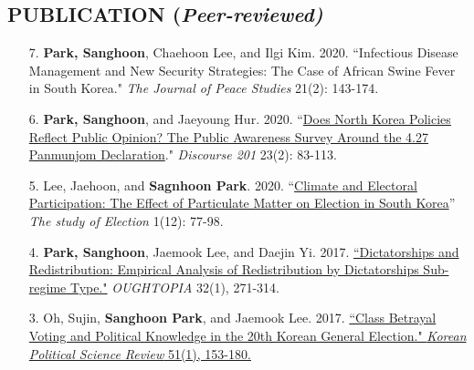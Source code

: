 \documentclass[11pt]{res} %
\begin{document}
\begin{resume}
\section{PUBLICATION (\it{Peer-reviewed})} 
\begin{enumerate}[leftmargin=*]
	\item[7.] \textbf{Park, Sanghoon}, Chaehoon Lee, and Ilgi Kim. 2020. ``Infectious Disease Management and New Security Strategies: The Case of African Swine Fever in South Korea." \textit{The Journal of Peace Studies} 21(2): 143-174.
	\item[6.] \textbf{Park, Sanghoon}, and Jaeyoung Hur. 2020. ``\href{journal.kstudy.com/ISS_DownLoad.asp?a_code=0g000726.pdf&inst=3345&isDownLoad=1&code=YqldZWtoSqVtJTNEMnMoNSUmN/B Z xLJTNEVHJpZQ==}{Does North Korea Policies Reflect Public Opinion? The Public Awareness Survey Around the 4.27 Panmunjom Declaration}." \textit{Discourse 201} 23(2): 83-113.
	\item[5.] Lee, Jaehoon, and \textbf{Sagnhoon Park}. 2020. ``\href{https://m.nec.go.kr/portal/cmm/fms/FileDown.do?atchFileId=5d0ffae936edc42f3b4e864801f86a0f4096c44da03fede418b94067e8f9d0ea&fileSn=1&bbsId=&searchYear=}{Climate and Electoral Participation: The Effect of Particulate Matter on Election in South Korea}'' \textit{The study of Election} 1(12): 77-98.  
	\item[4.] \textbf{Park, Sanghoon}, Jaemook Lee, and Daejin Yi. 2017. \href{http://www.dbpia.co.kr/Journal/ArticleDetail/NODE07183479?TotalCount=1&Seq=1&q=%5B%EB%8F%85%EC%9E%AC%EA%B5%AD%EA%B0%80%EC%99%80%20%EC%9E%AC%EB%B6%84%EB%B0%B0%C2%A7coldb%C2%A72%C2%A751%C2%A73%5D&searchWord=%EC%A0%84%EC%B2%B4%3D%5E%24%EB%8F%85%EC%9E%AC%EA%B5%AD%EA%B0%80%EC%99%80%20%EC%9E%AC%EB%B6%84%EB%B0%B0%5E*&Multimedia=0&isIdentifyAuthor=0&Collection=0&SearchAll=%EB%8F%85%EC%9E%AC%EA%B5%AD%EA%B0%80%EC%99%80%20%EC%9E%AC%EB%B6%84%EB%B0%B0&isFullText=0&specificParam=0&SearchMethod=0&Sort=1&SortType=desc&Page=1&PageSize=20#}{``Dictatorships and Redistribution: Empirical Analysis of Redistribution by Dictatorships Sub-regime Type."} \textit{OUGHTOPIA} 32(1), 271-314.
	\item[3.] Oh, Sujin, \textbf{Sanghoon Park}, and Jaemook Lee. 2017. \href{http://www.dbpia.co.kr/Journal/ArticleDetail/NODE07131578?TotalCount=1&Seq=1&q=%5B%EC%9D%B4%EC%9E%AC%EB%AC%B5%20%EC%98%A4%EC%88%98%EC%A7%84%20%EB%B0%95%EC%83%81%ED%9B%88%20%EA%B3%84%EA%B8%89%ED%88%AC%ED%91%9C%C2%A7coldb%C2%A72%C2%A751%C2%A73%5D&searchWord=%EC%A0%84%EC%B2%B4%3D%5E%24%EC%9D%B4%EC%9E%AC%EB%AC%B5%20%EC%98%A4%EC%88%98%EC%A7%84%20%EB%B0%95%EC%83%81%ED%9B%88%20%EA%B3%84%EA%B8%89%ED%88%AC%ED%91%9C%5E*&Multimedia=0&isIdentifyAuthor=0&Collection=0&SearchAll=%EC%9D%B4%EC%9E%AC%EB%AC%B5%20%EC%98%A4%EC%88%98%EC%A7%84%20%EB%B0%95%EC%83%81%ED%9B%88%20%EA%B3%84%EA%B8%89%ED%88%AC%ED%91%9C&isFullText=0&specificParam=0&SearchMethod=0&Sort=1&SortType=desc&Page=1&PageSize=20#}{``Class Betrayal Voting and Political Knowledge in the 20th Korean General Election." \textit{Korean Political Science Review} 51(1), 153-180.}

\end{enumerate}
\end{resume}
\end{document}
